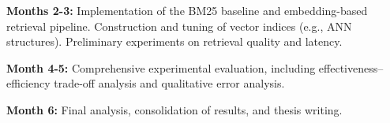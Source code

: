 \documentclass[a4paper]{scrartcl}
\begin{document}
\noindent \textbf{Months 2-3:}  
Implementation of the BM25 baseline and embedding-based retrieval pipeline. Construction and tuning of vector indices (e.g., ANN structures). Preliminary experiments on retrieval quality and latency.

\noindent \textbf{Month 4-5:}  
Comprehensive experimental evaluation, including effectiveness--efficiency trade-off analysis and qualitative error analysis.

\noindent \textbf{Month 6:}  
Final analysis, consolidation of results, and thesis writing.

% 
% 
\end{document}

